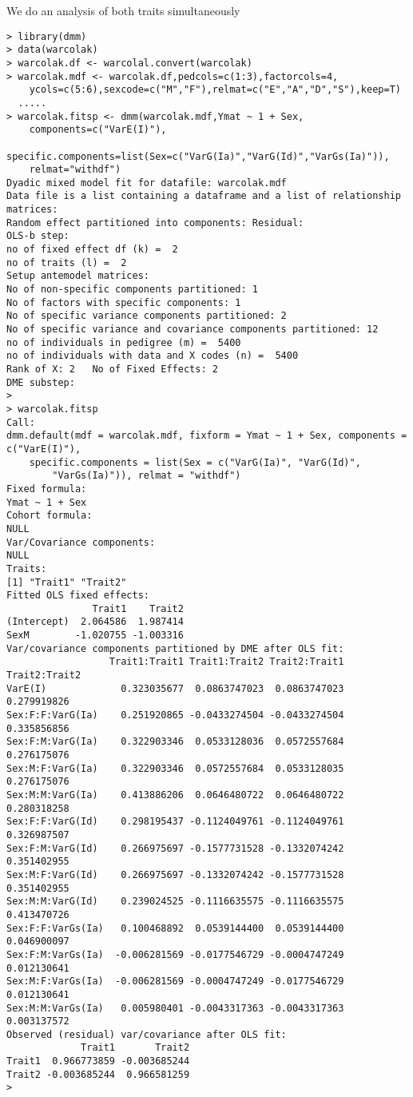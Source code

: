 \documentclass[titlepage]{article}  %
\begin{document}
We do an analysis of both traits simultaneously
\begin{verbatim}
> library(dmm)
> data(warcolak)
> warcolak.df <- warcolal.convert(warcolak)
> warcolak.mdf <- warcolak.df,pedcols=c(1:3),factorcols=4,
    ycols=c(5:6),sexcode=c("M","F"),relmat=c("E","A","D","S"),keep=T)
  .....
> warcolak.fitsp <- dmm(warcolak.mdf,Ymat ~ 1 + Sex,
    components=c("VarE(I)"),
    specific.components=list(Sex=c("VarG(Ia)","VarG(Id)","VarGs(Ia)")),
    relmat="withdf")
Dyadic mixed model fit for datafile: warcolak.mdf  
Data file is a list containing a dataframe and a list of relationship matrices:
Random effect partitioned into components: Residual:
OLS-b step:
no of fixed effect df (k) =  2 
no of traits (l) =  2 
Setup antemodel matrices:
No of non-specific components partitioned: 1 
No of factors with specific components: 1 
No of specific variance components partitioned: 2 
No of specific variance and covariance components partitioned: 12 
no of individuals in pedigree (m) =  5400 
no of individuals with data and X codes (n) =  5400 
Rank of X: 2   No of Fixed Effects: 2 
DME substep:
>
> warcolak.fitsp
Call:
dmm.default(mdf = warcolak.mdf, fixform = Ymat ~ 1 + Sex, components = c("VarE(I)"), 
    specific.components = list(Sex = c("VarG(Ia)", "VarG(Id)", 
        "VarGs(Ia)")), relmat = "withdf")
Fixed formula:
Ymat ~ 1 + Sex
Cohort formula:
NULL
Var/Covariance components:
NULL
Traits:
[1] "Trait1" "Trait2"
Fitted OLS fixed effects:
               Trait1    Trait2
(Intercept)  2.064586  1.987414
SexM        -1.020755 -1.003316
Var/covariance components partitioned by DME after OLS fit:
                  Trait1:Trait1 Trait1:Trait2 Trait2:Trait1 Trait2:Trait2
VarE(I)             0.323035677  0.0863747023  0.0863747023   0.279919826
Sex:F:F:VarG(Ia)    0.251920865 -0.0433274504 -0.0433274504   0.335856856
Sex:F:M:VarG(Ia)    0.322903346  0.0533128036  0.0572557684   0.276175076
Sex:M:F:VarG(Ia)    0.322903346  0.0572557684  0.0533128035   0.276175076
Sex:M:M:VarG(Ia)    0.413886206  0.0646480722  0.0646480722   0.280318258
Sex:F:F:VarG(Id)    0.298195437 -0.1124049761 -0.1124049761   0.326987507
Sex:F:M:VarG(Id)    0.266975697 -0.1577731528 -0.1332074242   0.351402955
Sex:M:F:VarG(Id)    0.266975697 -0.1332074242 -0.1577731528   0.351402955
Sex:M:M:VarG(Id)    0.239024525 -0.1116635575 -0.1116635575   0.413470726
Sex:F:F:VarGs(Ia)   0.100468892  0.0539144400  0.0539144400   0.046900097
Sex:F:M:VarGs(Ia)  -0.006281569 -0.0177546729 -0.0004747249   0.012130641
Sex:M:F:VarGs(Ia)  -0.006281569 -0.0004747249 -0.0177546729   0.012130641
Sex:M:M:VarGs(Ia)   0.005980401 -0.0043317363 -0.0043317363   0.003137572
Observed (residual) var/covariance after OLS fit:
             Trait1       Trait2
Trait1  0.966773859 -0.003685244
Trait2 -0.003685244  0.966581259
> 
\end{verbatim}
\end{document}
